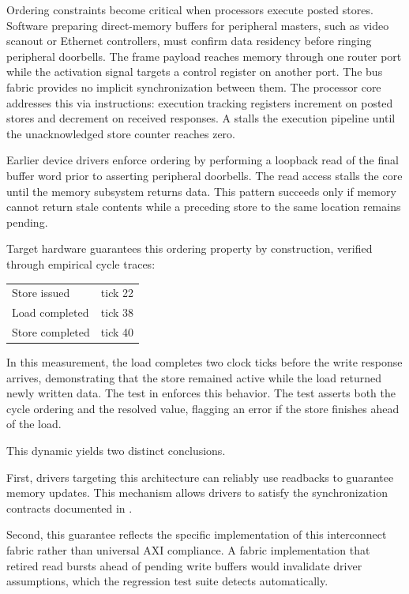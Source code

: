 \documentclass[journal,9pt]{IEEEtran}
\begin{document}
Ordering constraints become critical when processors execute posted stores.
Software preparing direct-memory buffers for peripheral masters, such as
video scanout or Ethernet controllers, must confirm data residency before
ringing peripheral doorbells. The frame payload reaches memory through one
router port while the activation signal targets a control register on
another port. The bus fabric provides no implicit synchronization between
them. The processor core addresses this via  instructions:
execution tracking registers increment on posted stores and decrement on
received responses. A  stalls the execution pipeline until the
unacknowledged store counter reaches zero.

Earlier device drivers enforce ordering by performing a loopback read of the
final buffer word prior to asserting peripheral doorbells. The read access
stalls the core until the memory subsystem returns data. This pattern
succeeds only if memory cannot return stale contents while a preceding store
to the same location remains pending.

Target hardware guarantees this ordering property by construction, verified
through empirical cycle traces:

\begin{center}\footnotesize
\begin{tabular}{@{}ll@{}}
\toprule
Store issued & tick 22 \\
Load completed & tick 38 \\
Store completed & tick 40 \\
\bottomrule
\end{tabular}
\end{center}

In this measurement, the load completes two clock ticks before the write
response arrives, demonstrating that the store remained active while the load
returned newly written data. The test
 in
 enforces this behavior. The test asserts both
the cycle ordering and the resolved value, flagging an error if the store
finishes ahead of the load.

This dynamic yields two distinct conclusions.

First, drivers targeting this architecture can reliably use readbacks to
guarantee memory updates. This mechanism allows drivers to satisfy the
synchronization contracts documented in .

Second, this guarantee reflects the specific implementation of this
interconnect fabric rather than universal AXI compliance. A fabric
implementation that retired read bursts ahead of pending write buffers
would invalidate driver assumptions, which the regression test suite
detects automatically.
\end{document}
